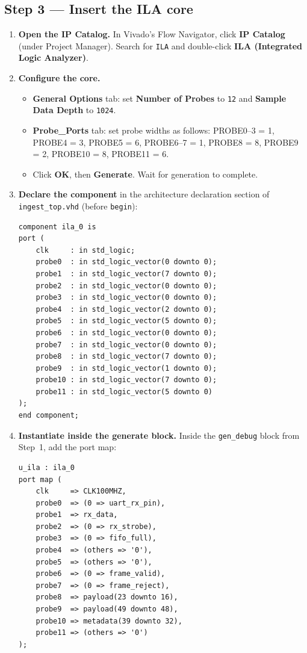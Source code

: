 \documentclass[11pt,letterpaper]{article}
\begin{document}
\subsection{Step 3 --- Insert the ILA core}
\begin{enumerate}[leftmargin=2em]

	\item \textbf{Open the IP Catalog.}
	In Vivado's Flow Navigator, click \textbf{IP Catalog} (under Project Manager). Search for \texttt{ILA} and double-click \textbf{ILA (Integrated Logic Analyzer)}.

	\item \textbf{Configure the core.}
	\begin{itemize}[leftmargin=1.5em]
		\item \textbf{General Options} tab: set \textbf{Number of Probes} to \texttt{12} and \textbf{Sample Data Depth} to \texttt{1024}.
		\item \textbf{Probe\_Ports} tab: set probe widths as follows: PROBE0--3 = 1, PROBE4 = 3, PROBE5 = 6, PROBE6--7 = 1, PROBE8 = 8, PROBE9 = 2, PROBE10 = 8, PROBE11 = 6.
		\item Click \textbf{OK}, then \textbf{Generate}. Wait for generation to complete.
	\end{itemize}

	\item \textbf{Declare the component} in the architecture declaration section of \texttt{ingest\_top.vhd} (before \texttt{begin}):
	\begin{verbatim}
component ila_0 is
port (
    clk     : in std_logic;
    probe0  : in std_logic_vector(0 downto 0);
    probe1  : in std_logic_vector(7 downto 0);
    probe2  : in std_logic_vector(0 downto 0);
    probe3  : in std_logic_vector(0 downto 0);
    probe4  : in std_logic_vector(2 downto 0);
    probe5  : in std_logic_vector(5 downto 0);
    probe6  : in std_logic_vector(0 downto 0);
    probe7  : in std_logic_vector(0 downto 0);
    probe8  : in std_logic_vector(7 downto 0);
    probe9  : in std_logic_vector(1 downto 0);
    probe10 : in std_logic_vector(7 downto 0);
    probe11 : in std_logic_vector(5 downto 0)
);
end component;
	\end{verbatim}

	\item \textbf{Instantiate inside the generate block.}
	Inside the \texttt{gen\_debug} block from Step~1, add the port map:
	\begin{verbatim}
u_ila : ila_0
port map (
    clk     => CLK100MHZ,
    probe0  => (0 => uart_rx_pin),
    probe1  => rx_data,
    probe2  => (0 => rx_strobe),
    probe3  => (0 => fifo_full),
    probe4  => (others => '0'),
    probe5  => (others => '0'),
    probe6  => (0 => frame_valid),
    probe7  => (0 => frame_reject),
    probe8  => payload(23 downto 16),
    probe9  => payload(49 downto 48),
    probe10 => metadata(39 downto 32),
    probe11 => (others => '0')
);
	\end{verbatim}


\end{enumerate}
\end{document}

